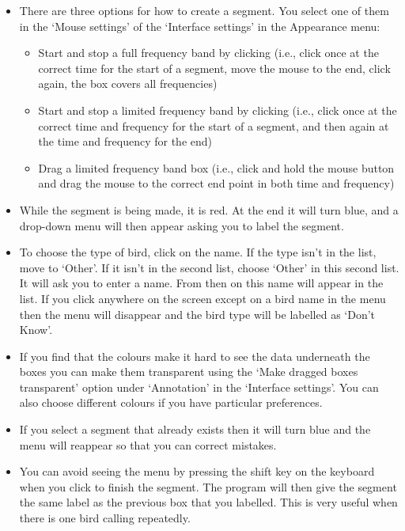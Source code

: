 \documentclass{article}
\begin{document}
\begin{itemize}
\item There are three options for how to create a segment. You select one of them in the `Mouse settings' of the `Interface settings' in the Appearance menu:
	\begin{itemize}
	\item Start and stop a full frequency band by clicking (i.e., click once at the correct time for the start of a segment, move the mouse to the end, click again, the box covers all frequencies)
	\item Start and stop a limited frequency band by clicking (i.e., click once at the correct time and frequency for the start of a segment, and then again at the time and frequency for the end)
	\item Drag a limited frequency band box (i.e., click and hold the mouse button and drag the mouse to the correct end point in both time and frequency)
	\end{itemize}

\item While the segment is being made, it is red. At the end it will turn blue, and a drop-down menu will then appear asking you to label the segment. 

\item To choose the type of bird, click on the name. If the type isn't in the list, move to `Other'. If it isn't in the second list, choose `Other' in this second list. It will ask you to enter a name. From then on this name will appear in the list. If you click anywhere on the screen except on a bird name in the menu then the menu will disappear and the bird type will be labelled as `Don't Know'.

\item If you find that the colours make it hard to see the data underneath the boxes you can make them transparent using the `Make dragged boxes transparent' option under `Annotation' in the `Interface settings'. You can also choose different colours if you have particular preferences.

\item If you select a segment that already exists then it will turn blue and the menu will reappear so that you can correct mistakes.

\item You can avoid seeing the menu by pressing the shift key on the keyboard when you click to finish the segment. The program will then give the segment the same label as the previous box that you labelled. This is very useful when there is one bird calling repeatedly.


\end{itemize}
\end{document}
